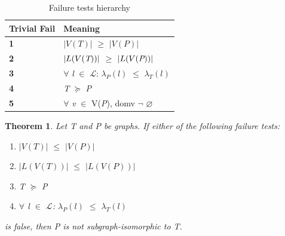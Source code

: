 \documentclass{l4proj}
\newtheorem{theorem}{Theorem}[section]
\newcommand{\Lagr}{\mathcal{L}}
\begin{document}
\begin{table}[H]
\centering
\renewcommand{\arraystretch}{1.5}%
\begin{tabular}{ >{\centering\bfseries}m{1in} >{\centering\arraybackslash}m{2.3in}} 
\toprule
  Trivial Fail & Meaning\\
\midrule
 \textbf{1} & $|V (T)|$ $\geq$ $|V (P)|$\\
 \rowcolor{Gray}
 \textbf{2} & $|L(V(\emph{T}))|$ $\geq$ $|L(V(\emph{P}))|$\\
 \textbf{3} & $\forall$ \emph{l} $\in$ $\Lagr$: $\lambda_{P}(l)$ $\leq$ $\lambda_{T}(l)$\\
 \rowcolor{Gray}
 \textbf{4} & \emph{T} $\succeq$ \emph{P}\\
 \textbf{5} & $\forall$ \emph{v} $\in$ V(\emph{P}), domv $\neg$  $\varnothing$\\
 \bottomrule
\end{tabular}
\caption{Failure tests hierarchy}
\label{table:failures}
\end{table}        

\begin{theorem}
\label{th:nds}
Let \emph{T} and \emph{P} be graphs. If either of the following failure tests:
\begin{enumerate}
\item \label{test1} $|V(T)|$ $\leq$ $|V(P)|$
\item \label{test2} $|L(V(T))|$ $\leq$ $|L(V(P))|$
\item \label{test3} T $\succeq$ P
\item \label{test4} $\forall$ \emph{l} $\in$ $\Lagr$: $\lambda_{P}(l)$ $\leq$ $\lambda_{T}(l)$
\end{enumerate}
is false, then \emph{P} is not subgraph-isomorphic to \emph{T}.
\end{theorem}
\end{document}

